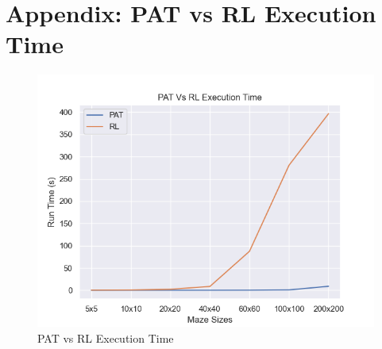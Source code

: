 \documentclass[twoside, 12pt, a4paper]{article}
\begin{document}
\newpage
\section {Appendix: PAT vs RL Execution Time} \label{appendix:PATvsRL}
\begin{figure}[ht]
\begin{center}
\includegraphics[width=18cm]{ExecutionTime.png}
\caption{\label{tab:table-name}PAT vs RL Execution Time}
\end{center}
\end{figure}
\end{document}
